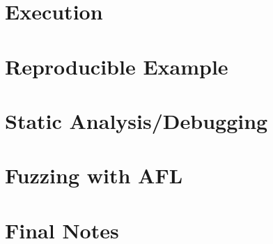 \documentclass[12pt, letterpaper]{article}
\begin{document}
\begin{sloppypar}
\begin{flushleft}
\section*{Execution}


\section*{Reproducible Example}


\section*{Static Analysis/Debugging}


\section*{Fuzzing with AFL}


\section*{Final Notes}

\end{flushleft}
\end{sloppypar}
\end{document}
